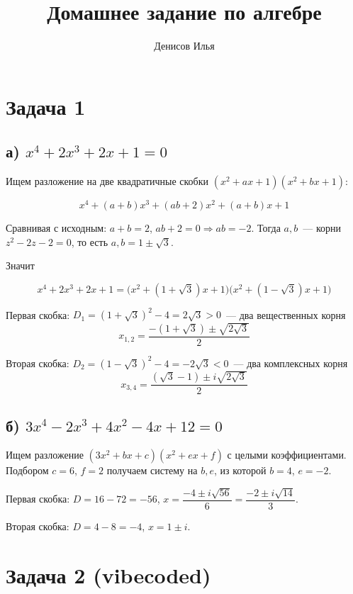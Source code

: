 \documentclass[12pt]{article}
\title{Домашнее задание по алгебре}
\author{Денисов Илья}
\date{}
\begin{document}
	\maketitle

	\section*{Задача 1}
	
	\subsection*{а) $x^4 + 2x^3 + 2x+1 = 0$}
	
	Ищем разложение на две квадратичные скобки $(x^2 + ax + 1)(x^2 + bx + 1)$:
	
	\[
		x^4 + (a + b)x^3 + (ab + 2)x^2 + (a + b)x + 1
	\]
	
	Сравнивая с исходным: $a + b = 2$, $ab + 2 = 0 \Rightarrow ab = -2$. Тогда $a, b$~--- корни $z^2 - 2z - 2 = 0$, то есть $a, b = 1 \pm \sqrt{3}$.
	
	Значит
	
	\[
		x^4 + 2x^3 + 2x + 1 = \bigl( x^2 + ( 1 + \sqrt{3})x + 1 \bigr) \bigl( x^2 + (1 - \sqrt{3})x + 1 \bigr)
	\]
	
	Первая скобка: $D_1 = (1 + \sqrt{3})^2 - 4 = 2 \sqrt{3} > 0$~--- два вещественных корня
	\[
		x_{1, 2} = \dfrac{-(1 + \sqrt{3}) \pm \sqrt{2 \sqrt{3}}}{2}
	\]
	
	Вторая скобка: $D_2 = (1 - \sqrt{3})^2 - 4 = -2 \sqrt{3} < 0$~--- два комплексных корня
	\[
		x_{3, 4} = \dfrac{(\sqrt{3} - 1) \pm i \sqrt{2 \sqrt{3}}}{2}
	\]
	
	\subsection*{б) $3x^4-2x^3+4x^2-4x+12=0$}
	
	Ищем разложение $(3x^2 + bx + c)(x^2 + ex + f)$ с целыми коэффициентами. Подбором $c = 6$, $f = 2$ получаем систему на $b, e$, из которой $b = 4$, $e = -2$.
	
	Первая скобка: $D = 16 - 72 = -56$, $x = \dfrac{-4 \pm i \sqrt{56}}{6} = \dfrac{-2 \pm i \sqrt{14}}{3}$.
	
	Вторая скобка: $D = 4 - 8 = -4$, $x = 1 \pm i$.
	
	\section*{Задача 2 (vibecoded)}
	
\end{document}
